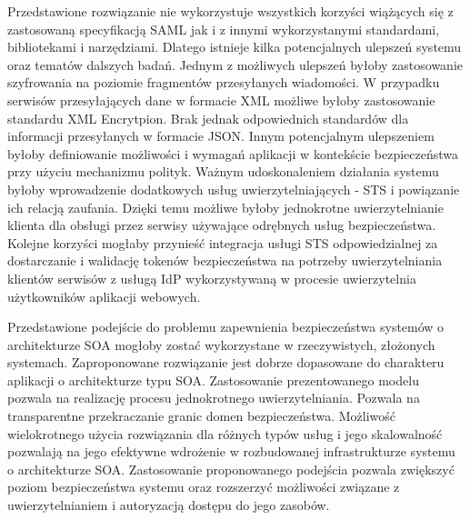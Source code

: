 Przedstawione rozwiązanie nie wykorzystuje wszystkich korzyści wiążących się z zastosowaną specyfikacją SAML jak i z innymi wykorzystanymi standardami, bibliotekami i narzędziami. Dlatego istnieje kilka potencjalnych ulepszeń systemu oraz tematów dalszych badań. Jednym z możliwych ulepszeń byłoby zastosowanie szyfrowania na poziomie fragmentów przesyłanych wiadomości. W przypadku serwisów przesyłających dane w formacie XML możliwe byłoby zastosowanie standardu XML Encrytpion. Brak jednak odpowiednich standardów dla informacji przesyłanych w formacie JSON. Innym potencjalnym ulepszeniem byłoby definiowanie możliwości i wymagań aplikacji w kontekście bezpieczeństwa przy użyciu mechanizmu polityk. Ważnym udoskonaleniem działania systemu byłoby wprowadzenie dodatkowych usług uwierzytelniających - STS i powiązanie ich relacją zaufania. Dzięki temu możliwe byłoby jednokrotne uwierzytelnianie klienta dla obsługi przez serwisy używające odrębnych usług bezpieczeństwa. Kolejne korzyści mogłaby przynieść integracja usługi STS odpowiedzialnej za dostarczanie i walidację tokenów bezpieczeństwa na potrzeby uwierzytelniania klientów serwisów z usługą IdP wykorzystywaną w procesie uwierzytelnia użytkowników aplikacji webowych.

Przedstawione podejście do problemu zapewnienia bezpieczeństwa systemów o architekturze SOA mogłoby zostać wykorzystane w rzeczywistych, złożonych systemach. Zaproponowane rozwiązanie jest dobrze dopasowane do charakteru aplikacji o architekturze typu SOA. Zastosowanie prezentowanego modelu pozwala na realizację procesu jednokrotnego uwierzytelniania. Pozwala na transparentne przekraczanie granic domen bezpieczeństwa. Możliwość wielokrotnego użycia rozwiązania dla różnych typów usług i jego skalowalność pozwalają na jego efektywne wdrożenie w rozbudowanej infrastrukturze systemu o architekturze SOA. Zastosowanie proponowanego podejścia pozwala zwiększyć poziom bezpieczeństwa systemu oraz rozszerzyć możliwości związane z uwierzytelnianiem i autoryzacją dostępu do jego zasobów.

